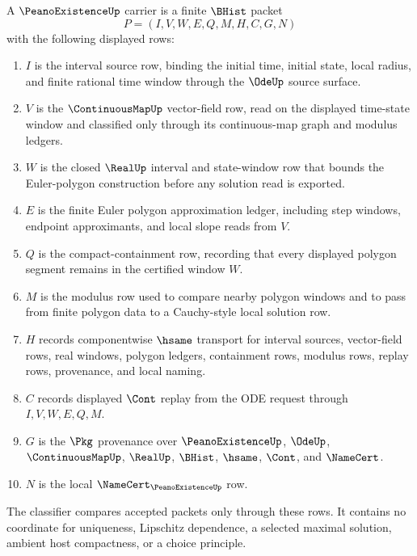 \begin{definition}
\label{def:peano-existence-carrier}
A $\PeanoExistenceUp$ carrier is a finite $\BHist$ packet
$$
P=(I,V,W,E,Q,M,H,C,G,N)
$$
with the following displayed rows:
\begin{enumerate}
\item $I$ is the interval source row, binding the initial time, initial state, local radius, and finite rational time window through the $\OdeUp$ source surface.
\item $V$ is the $\ContinuousMapUp$ vector-field row, read on the displayed time-state window and classified only through its continuous-map graph and modulus ledgers.
\item $W$ is the closed $\RealUp$ interval and state-window row that bounds the Euler-polygon construction before any solution read is exported.
\item $E$ is the finite Euler polygon approximation ledger, including step windows, endpoint approximants, and local slope reads from $V$.
\item $Q$ is the compact-containment row, recording that every displayed polygon segment remains in the certified window $W$.
\item $M$ is the modulus row used to compare nearby polygon windows and to pass from finite polygon data to a Cauchy-style local solution row.
\item $H$ records componentwise $\hsame$ transport for interval sources, vector-field rows, real windows, polygon ledgers, containment rows, modulus rows, replay rows, provenance, and local naming.
\item $C$ records displayed $\Cont$ replay from the ODE request through $I,V,W,E,Q,M$.
\item $G$ is the $\Pkg$ provenance over $\PeanoExistenceUp$, $\OdeUp$, $\ContinuousMapUp$, $\RealUp$, $\BHist$, $\hsame$, $\Cont$, and $\NameCert$.
\item $N$ is the local $\NameCert_{\PeanoExistenceUp}$ row.
\end{enumerate}
The classifier compares accepted packets only through these rows. It contains no coordinate for uniqueness, Lipschitz dependence, a selected maximal solution, ambient host compactness, or a choice principle.
\end{definition}

